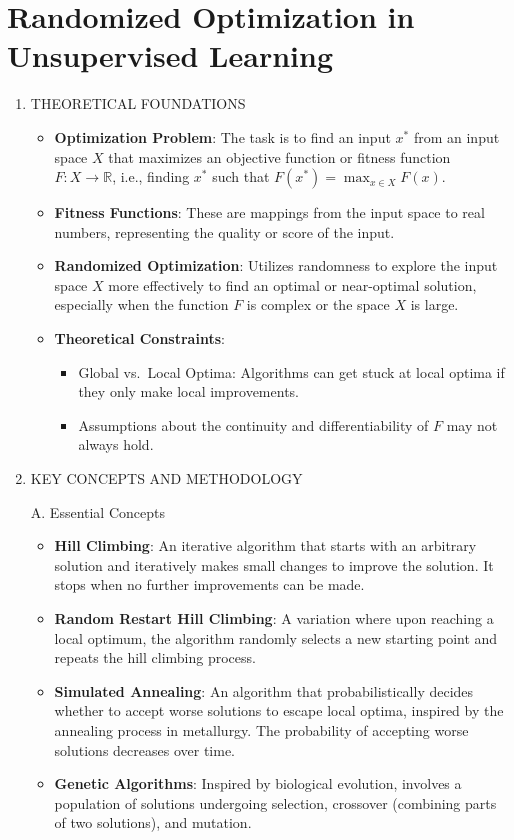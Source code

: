 \documentclass[
  12pt,
]{report}
\providecommand{\tightlist}{%
  \setlength{\itemsep}{0pt}\setlength{\parskip}{0pt}}
\begin{document}
\chapter{Randomized Optimization in Unsupervised Learning}

\begin{enumerate}
\def\labelenumi{\arabic{enumi}.}
\item
  THEORETICAL FOUNDATIONS

  \begin{itemize}
  \item
    \textbf{Optimization Problem}: The task is to find an input \(x^*\) from an input space \(X\) that maximizes an objective function or fitness function \(F: X \rightarrow \mathbb{R}\), i.e., finding \(x^*\) such that \(F(x^*) = \max_{x \in X} F(x)\).
  \item
    \textbf{Fitness Functions}: These are mappings from the input space to real numbers, representing the quality or score of the input.
  \item
    \textbf{Randomized Optimization}: Utilizes randomness to explore the input space \(X\) more effectively to find an optimal or near-optimal solution, especially when the function \(F\) is complex or the space \(X\) is large.
  \item
    \textbf{Theoretical Constraints}:

    \begin{itemize}
    \tightlist
    \item
      Global vs.~Local Optima: Algorithms can get stuck at local optima if they only make local improvements.
    \item
      Assumptions about the continuity and differentiability of \(F\) may not always hold.
    \end{itemize}
  \end{itemize}
\item
  KEY CONCEPTS AND METHODOLOGY

  A. Essential Concepts

  \begin{itemize}
  \tightlist
  \item
    \textbf{Hill Climbing}: An iterative algorithm that starts with an arbitrary solution and iteratively makes small changes to improve the solution. It stops when no further improvements can be made.
  \item
    \textbf{Random Restart Hill Climbing}: A variation where upon reaching a local optimum, the algorithm randomly selects a new starting point and repeats the hill climbing process.
  \item
    \textbf{Simulated Annealing}: An algorithm that probabilistically decides whether to accept worse solutions to escape local optima, inspired by the annealing process in metallurgy. The probability of accepting worse solutions decreases over time.
  \item
    \textbf{Genetic Algorithms}: Inspired by biological evolution, involves a population of solutions undergoing selection, crossover (combining parts of two solutions), and mutation.
  \end{itemize}


\end{enumerate}
\end{document}
